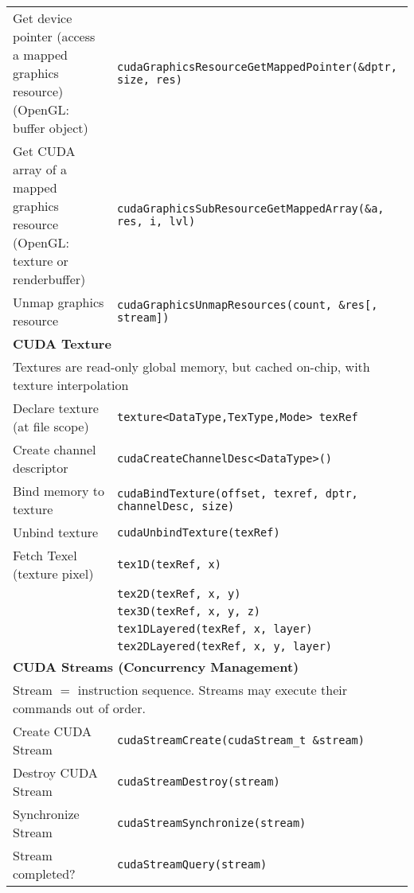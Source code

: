 \documentclass[a4paper,10pt,landscape]{article}
\begin{document}
\begin{multicols*}{2}
\begin{tabular}{p{5.5cm}p{7cm}}
Get device pointer (access a mapped graphics resource)\newline 
(OpenGL: buffer object)\vspace{.4em} & \lstinline$cudaGraphicsResourceGetMappedPointer(&dptr, size, res)$\\
Get CUDA array of a mapped graphics resource\newline 
(OpenGL: texture or renderbuffer)\vspace{.4em} & \lstinline$cudaGraphicsSubResourceGetMappedArray(&a, res, i, lvl)$\\
Unmap graphics resource & \lstinline$cudaGraphicsUnmapResources(count, &res[, stream])$\\
\multicolumn{2}{l}{\textbf{CUDA Texture}} \\
\multicolumn{2}{l}{Textures are read-only global memory, but cached on-chip, with texture interpolation\vspace{.4em}}\\
Declare texture (at file scope) & \lstinline$texture<DataType,TexType,Mode> texRef$\\
Create channel descriptor & \lstinline$cudaCreateChannelDesc<DataType>()$\\
Bind memory to texture & \lstinline$cudaBindTexture(offset, texref, dptr, channelDesc, size)$\\
Unbind texture & \lstinline$cudaUnbindTexture(texRef)$\\
Fetch Texel (texture pixel) & \lstinline$tex1D(texRef, x)$\\
& \lstinline$tex2D(texRef, x, y)$\\
& \lstinline$tex3D(texRef, x, y, z)$\\
& \lstinline$tex1DLayered(texRef, x, layer)$\\
& \lstinline$tex2DLayered(texRef, x, y, layer)$\\
\multicolumn{2}{l}{\textbf{CUDA Streams (Concurrency Management)}} \\
\multicolumn{2}{l}{Stream $=$ instruction sequence. Streams may execute their commands out of order.\vspace{.4em}}\\
Create CUDA Stream & \lstinline$cudaStreamCreate(cudaStream_t &stream)$\\
Destroy CUDA Stream & \lstinline$cudaStreamDestroy(stream)$\\
Synchronize Stream & \lstinline$cudaStreamSynchronize(stream)$\\
Stream completed? & \lstinline$cudaStreamQuery(stream)$\\
\end{tabular}


\end{multicols*}
\end{document}
